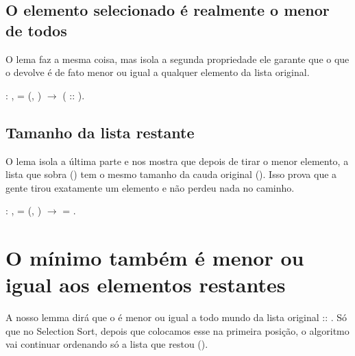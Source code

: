 \subsection{O elemento selecionado é realmente o menor de todos}




    O lema  faz a mesma coisa, mas isola a segunda propriedade ele garante que o  que o  devolve é de fato menor ou igual a qualquer elemento da lista original.
\begin{coqdoccode}
\coqdocemptyline
\coqdocnoindent
{}  :\coqdoceol
\coqdocindent{1.00em}
\coqdockw{\ensuremath{\forall}}    ,\coqdoceol
\coqdocindent{2.00em}
   = (, ) \ensuremath{\rightarrow}\coqdoceol
\coqdocindent{2.00em}
  ( :: ).\coqdoceol
\coqdocemptyline
\end{coqdoccode}
\subsection{Tamanho da lista restante}




    O lema  isola a última parte e nos mostra que depois de tirar o menor elemento, a lista que sobra () tem o mesmo tamanho da cauda original (). Isso prova que a gente tirou exatamente um elemento e não perdeu nada no caminho.
\begin{coqdoccode}
\coqdocemptyline
\coqdocnoindent
{}  :\coqdoceol
\coqdocindent{1.00em}
\coqdockw{\ensuremath{\forall}}    ,\coqdoceol
\coqdocindent{2.00em}
   = (, ) \ensuremath{\rightarrow}\coqdoceol
\coqdocindent{2.00em}
  =  .\coqdoceol
\coqdocemptyline
\end{coqdoccode}
\section{O mínimo também é menor ou igual aos elementos restantes}




    A nosso lemma dirá que o  é menor ou igual a todo mundo da lista original  :: .
    Só que no Selection Sort, depois que colocamos esse  na primeira posição, o algoritmo vai continuar ordenando só a lista que restou ().


